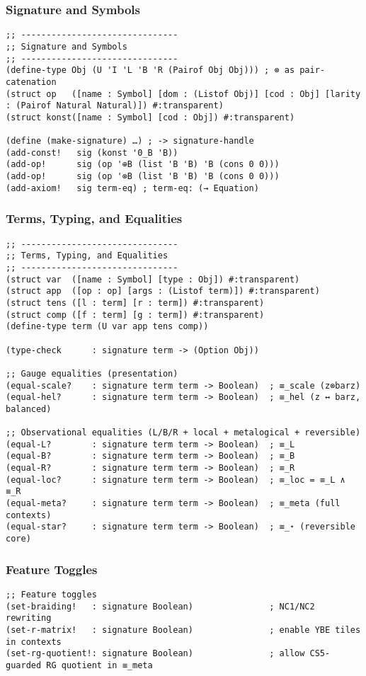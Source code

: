 \subsubsection{Signature and Symbols}
\begin{verbatim}
;; -------------------------------
;; Signature and Symbols
;; -------------------------------
(define-type Obj (U 'I 'L 'B 'R (Pairof Obj Obj))) ; ⊗ as pair-catenation
(struct op   ([name : Symbol] [dom : (Listof Obj)] [cod : Obj] [larity : (Pairof Natural Natural)]) #:transparent)
(struct konst([name : Symbol] [cod : Obj]) #:transparent)

(define (make-signature) …) ; -> signature-handle
(add-const!   sig (konst '0_B 'B))
(add-op!      sig (op '⊕B (list 'B 'B) 'B (cons 0 0)))
(add-op!      sig (op '⊗B (list 'B 'B) 'B (cons 0 0)))
(add-axiom!   sig term-eq) ; term-eq: (→ Equation)
\end{verbatim}

\subsubsection{Terms, Typing, and Equalities}
\begin{verbatim}
;; -------------------------------
;; Terms, Typing, and Equalities
;; -------------------------------
(struct var  ([name : Symbol] [type : Obj]) #:transparent)
(struct app  ([op : op] [args : (Listof term)]) #:transparent)
(struct tens ([l : term] [r : term]) #:transparent)
(struct comp ([f : term] [g : term]) #:transparent)
(define-type term (U var app tens comp))

(type-check      : signature term -> (Option Obj))

;; Gauge equalities (presentation)
(equal-scale?    : signature term term -> Boolean)  ; ≡_scale (z⊗barz)
(equal-hel?      : signature term term -> Boolean)  ; ≡_hel (z ↔ barz, balanced)

;; Observational equalities (L/B/R + local + metalogical + reversible)
(equal-L?        : signature term term -> Boolean)  ; ≡_L
(equal-B?        : signature term term -> Boolean)  ; ≡_B
(equal-R?        : signature term term -> Boolean)  ; ≡_R
(equal-loc?      : signature term term -> Boolean)  ; ≡_loc = ≡_L ∧ ≡_R
(equal-meta?     : signature term term -> Boolean)  ; ≡_meta (full contexts)
(equal-star?     : signature term term -> Boolean)  ; ≡_⋆ (reversible core)
\end{verbatim}

\subsubsection{Feature Toggles}
\begin{verbatim}
;; Feature toggles
(set-braiding!   : signature Boolean)               ; NC1/NC2 rewriting
(set-r-matrix!   : signature Boolean)               ; enable YBE tiles in contexts
(set-rg-quotient!: signature Boolean)               ; allow CS5-guarded RG quotient in ≡_meta
\end{verbatim}

